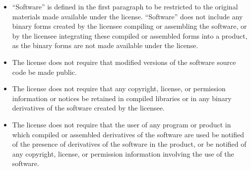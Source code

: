 \begin{itemize}
\item ``Software'' is defined in the first paragraph to 
      be restricted to the original materials made 
      available under the license.  ``Software'' does not 
      include any binary forms created by the licensee 
      compiling or assembling the software, or by the
      licensee integrating these compiled or assembled forms 
      into a product, as the binary forms are not made 
      available under the license.
\item The license does not require that modified versions
      of the software source code be made public.
\item The license does not require that any copyright, 
      license, or permission information or notices be 
      retained in compiled libraries or in any binary 
      derivatives of the software created by the licensee.
\item The license does not require that the user of any 
      program or product in which compiled or assembled 
      derivatives of the software are used be notified of 
      the presence of derivatives of the software in the 
      product, or be notified of any copyright, license, or 
      permission information involving the use of the 
      software.
\end{itemize}

